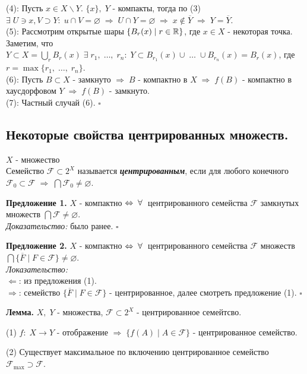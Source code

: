 \documentclass[../../main.tex]{subfiles}
\begin{document}
(4): Пусть $x\in X\backslash Y$. $\{x\},\; Y$ - компакты, тогда по (3) $\exists\; U\ni x, V\supset Y:\; u\cap V=\varnothing\; \Rightarrow \; U\cap Y = \varnothing\;\Rightarrow\; x\notin \overline Y\; \Rightarrow\; Y=\overline Y$.\\
(5): Рассмотрим открытые шары $\{B_r(x)\; | \; r\in\mathbb{R}\}$, где $x\in X$ - некоторая точка. Заметим, что $Y\subset X = \bigcup\limits_r B_r(x)\; \exists\; r_1,\; \ldots ,\; r_n:\; Y\subset B_{r_1}(x)\cup\; \ldots \;\cup B_{r_n}(x) = B_r(x)$, где $r = \max\{r_1,\; \ldots ,\; r_n\}$.\\
(6): Пусть $B\subset X$ - замкнуто $\Rightarrow\; B$ - компактно в $X\;\Rightarrow\; f(B)$ - компактно в хаусдорфовом $Y\;\Rightarrow\; f(B)$ - замкнуто.\\
(7): Частный случай (6). $\square$

\subsection{Некоторые свойства центрированных множеств.}
$X$ - множество\\
 Семейство $\mathcal{F}\subset 2^X$ называется \textbf{\textit{центрированным}}, если для любого конечного $\mathcal{F}_0\subset \mathcal{F}\; \Rightarrow\; \bigcap \mathcal{F}_0\neq \varnothing$. 

\textbf{Предложение 1.} $X$ - компактно $\Leftrightarrow \; \forall\:$ центрированного семейства $\mathcal{F}$ замкнутых множеств $\bigcap\mathcal{F} \neq \varnothing$.\\
\textit{Доказательство:} было ранее. $\square$

\textbf{Предложение 2.} $X$ - компактно $\Leftrightarrow \; \forall\:$ центрированного семейства $\mathcal{F}$ множеств $\bigcap\{\overline F\; | \; F \in \mathcal{F}\} \neq \varnothing$.\\
\textit{Локазательство:}\\
$\Leftarrow$: из предложения (1).\\
$\Rightarrow$: семейство $\{\overline F\; | \; F \in \mathcal{F}\}$ - центрированное, далее смотреть предложение (1). $\square$

\textbf{Лемма.} $X,\; Y$ - множества, $\mathcal F \subset 2^X$ - центрированное семейтсво.

(1) $f:\; X\rightarrow Y$ - отображение $\Rightarrow\; \{f(A)\; | \; A \in \mathcal{F}\}$ - центрированное семейство.

(2) Существует максимальное по включению центрированное семейство $\mathcal F_{\text{max}}\supset\mathcal F$.
\end{document}
